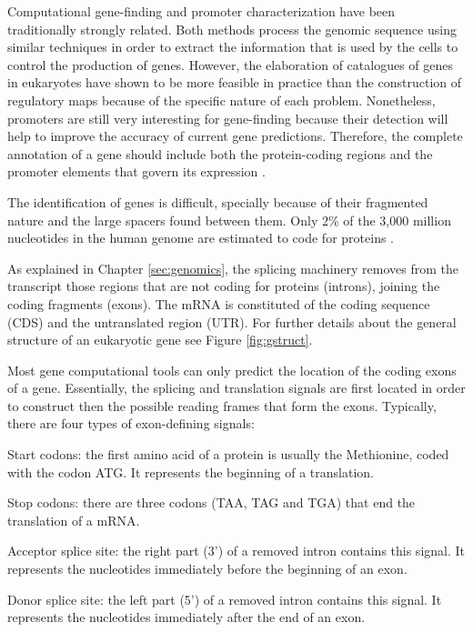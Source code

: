 Computational gene-finding and promoter characterization have been traditionally
strongly related. Both methods process the genomic sequence using similar techniques
in order to extract the information that is used by the cells to control the
production of genes. However, the elaboration of catalogues of genes in eukaryotes 
have shown to be more feasible in practice than the construction of regulatory maps 
because of the specific nature of each problem. Nonetheless, promoters are still very 
interesting for gene-finding because their detection will help to improve the accuracy 
of current gene predictions. Therefore, the complete annotation of a gene should include 
both the protein-coding regions and the promoter elements that govern its 
expression \citep{pedersen:1999a}.


The identification of genes is difficult, specially because of their fragmented
nature and the large spacers found between them. Only 2\% of the 3,000 million 
nucleotides in the human genome are estimated to code for proteins \citep{venter:2001a}. 

As explained in Chapter \ref{sec:genomics}, the splicing machinery removes from the 
transcript those regions that are not coding for proteins (introns), joining the coding 
fragments (exons). The mRNA is constituted of the coding sequence (CDS) and the
untranslated region (UTR). For further details about the general structure of an 
eukaryotic gene see Figure \ref{fig:gstruct}.

Most gene computational tools can only predict the location of the coding exons
of a gene. Essentially, the splicing and translation signals are first located
in order to construct then the possible reading frames that form the exons.
Typically, there are four types of exon-defining signals: 

\begin{menumerate}
\item
Start codons: 
the first amino acid of a protein is usually the Methionine,
coded with the codon ATG. It represents the beginning of a translation.
\item
Stop codons: 
there are three codons (TAA, TAG and TGA) that end the translation of a mRNA.
\item
Acceptor splice site:  
the right part (3') of a removed intron contains this
signal. It represents the nucleotides immediately before the beginning of
an exon.
\item
Donor splice site:  
the left part (5') of a removed intron contains this
signal. It represents the nucleotides immediately after the end of
an exon.
\end{menumerate}

